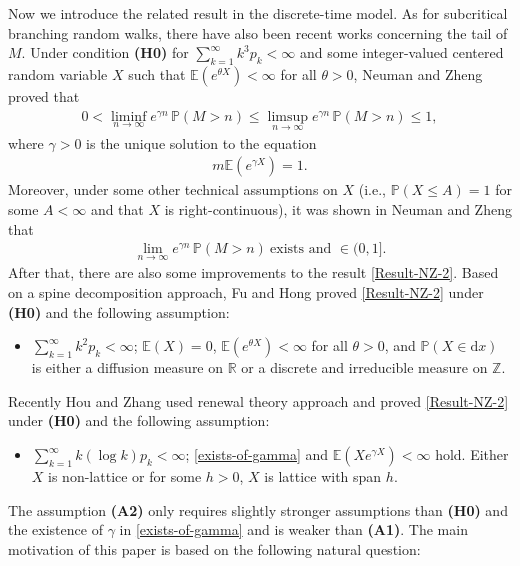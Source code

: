\documentclass[11pt]{article}
\numberwithin{equation}{section}
\begin{document}
Now we introduce the related result in the discrete-time model. As for subcritical branching random walks, there have also been recent works concerning the tail of $M$.  Under condition {\bf(H0)} for  $\sum_{k=1}^\infty k^3p_k<\infty$ and some integer-valued centered random variable $X$ such that  $\mathbb{E}(e^{\theta X}) < \infty$ for all $\theta > 0$, Neuman and Zheng \cite{NZ2017} proved that
\begin{align} 
	0 < \liminf_{n \to \infty} e^{\gamma n} \, \mathbb{P}(M > n) \leq \limsup_{n \to \infty} e^{\gamma n} \, \mathbb{P}(M > n) \leq 1,
\end{align}
where $\gamma > 0$ is the unique solution to the equation 
\begin{align}\label{exists-of-gamma}
	m\mathbb{E}(e^{\gamma X}) = 1.
\end{align}
  Moreover, under some other technical assumptions on $X$ (i.e., $\mathbb{P}(X\leq A)=1$ for some $A<\infty$ and that $X$ is right-continuous), it was shown in Neuman and Zheng \cite{NZ2017} that 
  \begin{align}\label{Result-NZ-2}
  	\lim_{n\to\infty} e^{\gamma n} \, \mathbb{P}(M > n)\ \mbox{exists and } \in (0,1].
  \end{align} 
  After that, there are also some improvements to the result \eqref{Result-NZ-2}. 
  Based on a spine decomposition approach, Fu and Hong \cite{FH2025} proved \eqref{Result-NZ-2} under {\bf(H0)} and the following assumption:
  \begin{itemize}
  	\item[\bf (A1)] $ \sum_{k=1}^\infty k^2 p_k < \infty$; $\mathbb{E}(X) = 0$, $\mathbb{E}(e^{\theta X}) < \infty$ for all $\theta > 0$, and $\mathbb{P}(X \in \mathrm{d} x)$ is either a diffusion measure on $\mathbb{R}$ or a discrete and irreducible measure on $\mathbb{Z}$. 
  \end{itemize}
  Recently Hou and Zhang \cite{HZ2025} used renewal theory approach and proved \eqref{Result-NZ-2} under {\bf(H0)} and  the following assumption:
  \begin{itemize}
  	\item[\bf (A2)] $ \sum_{k=1}^\infty k(\log k)p_k < \infty$; \eqref{exists-of-gamma} and $\mathbb{E}(X e^{\gamma X}) < \infty$ hold. Either $X$ is non-lattice or for some $h>0$, $X$ is lattice with span $h$.
  \end{itemize}
The assumption {\bf (A2)}  only requires slightly stronger assumptions  than  {\bf(H0)} and the existence of $\gamma$ in \eqref{exists-of-gamma} and is weaker than {\bf (A1)}. The main motivation of this paper is based on the following natural question:
\end{document}
